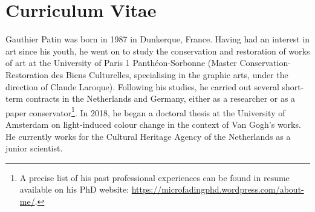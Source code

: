 


\chapter*{Curriculum Vitae}





Gauthier Patin was born in 1987 in Dunkerque, France. Having had an interest in art since his youth, he went on to study the conservation and restoration of works of art at the University of Paris 1 Panthéon-Sorbonne (Master Conservation-Restoration des Biens Culturelles, specialising in the graphic arts, under the direction of Claude Laroque). Following his studies, he carried out several short-term contracts in the Netherlands and Germany, either as a researcher or as a paper conservator\footnote{A precise list of his past professional experiences can be found in resume available on his PhD website: \url{https://microfadingphd.wordpress.com/about-me/}.}. In 2018, he began a doctoral thesis at the University of Amsterdam on light-induced colour change in the context of Van Gogh's works. He currently works for the Cultural Heritage Agency of the Netherlands as a junior scientist. 
 
 